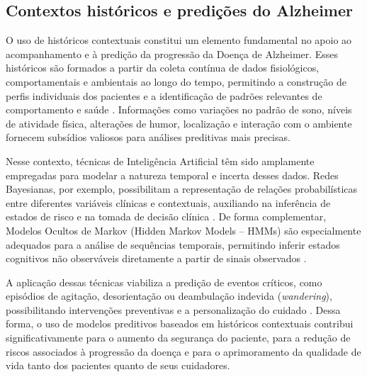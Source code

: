 \documentclass[conference,a4paper,10pt]{IEEETran}
\begin{document}
\subsection{Contextos históricos e predições do Alzheimer}

O uso de históricos contextuais constitui um elemento fundamental no apoio ao acompanhamento e à predição da progressão da Doença de Alzheimer. Esses históricos são formados a partir da coleta contínua de dados fisiológicos, comportamentais e ambientais ao longo do tempo, permitindo a construção de perfis individuais dos pacientes e a identificação de padrões relevantes de comportamento e saúde \cite{lv_iCare}. Informações como variações no padrão de sono, níveis de atividade física, alterações de humor, localização e interação com o ambiente fornecem subsídios valiosos para análises preditivas mais precisas.

Nesse contexto, técnicas de Inteligência Artificial têm sido amplamente empregadas para modelar a natureza temporal e incerta desses dados. Redes Bayesianas, por exemplo, possibilitam a representação de relações probabilísticas entre diferentes variáveis clínicas e contextuais, auxiliando na inferência de estados de risco e na tomada de decisão clínica \cite{QiuPredictiveModeling}. De forma complementar, Modelos Ocultos de Markov (Hidden Markov Models – HMMs) são especialmente adequados para a análise de sequências temporais, permitindo inferir estados cognitivos não observáveis diretamente a partir de sinais observados \cite{Sukkar2012Disease}.

A aplicação dessas técnicas viabiliza a predição de eventos críticos, como episódios de agitação, desorientação ou deambulação indevida (\textit{wandering}), possibilitando intervenções preventivas e a personalização do cuidado \cite{ChiarandiniWandering}. Dessa forma, o uso de modelos preditivos baseados em históricos contextuais contribui significativamente para o aumento da segurança do paciente, para a redução de riscos associados à progressão da doença e para o aprimoramento da qualidade de vida tanto dos pacientes quanto de seus cuidadores.
\end{document}

